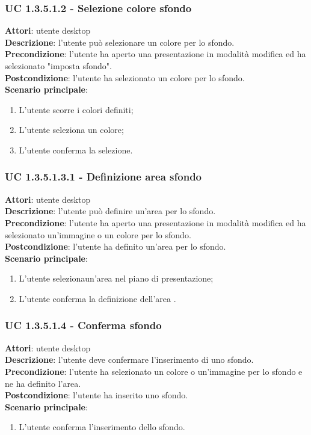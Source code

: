\subsubsection{UC 1.3.5.1.2 - Selezione colore sfondo}{
	\label{uc1.3.5.1.2}
	\textbf{Attori}: utente desktop \\
	\textbf{Descrizione}: l'utente può selezionare un colore per lo sfondo. \\
	\textbf{Precondizione}: l'utente ha aperto una presentazione in modalità modifica ed ha selezionato "imposta sfondo".	\\
	\textbf{Postcondizione}: l'utente ha selezionato un colore per lo sfondo.	\\
	\textbf{Scenario principale}:
	\begin{enumerate}
		\item L'utente scorre i colori definiti;
		\item L'utente seleziona un colore;
		\item L'utente conferma la selezione.
	\end{enumerate}
}
\subsubsection{UC 1.3.5.1.3.1 - Definizione area sfondo}{
	\label{uc1.3.5.1.3.1}
	\textbf{Attori}: utente desktop \\
	\textbf{Descrizione}: l'utente può definire un'area per lo sfondo. \\
	\textbf{Precondizione}: l'utente ha aperto una presentazione in modalità modifica ed ha selezionato un'immagine o un colore per lo sfondo.	\\
	\textbf{Postcondizione}: l'utente ha definito un'area per lo sfondo.	\\
	\textbf{Scenario principale}:
	\begin{enumerate}
		\item L'utente selezionaun'area nel piano di presentazione;
		\item L'utente conferma la definizione dell'area .
	\end{enumerate}
}

\subsubsection{UC 1.3.5.1.4 - Conferma sfondo}{
	\label{uc1.3.5.1.4}
	\textbf{Attori}: utente desktop \\
	\textbf{Descrizione}: l'utente deve confermare l'inserimento di uno sfondo. \\
	\textbf{Precondizione}: l'utente ha selezionato un colore o un'immagine per lo sfondo e ne ha definito l'area.	\\
	\textbf{Postcondizione}: l'utente ha inserito uno sfondo.	\\
	\textbf{Scenario principale}:
	\begin{enumerate}
		\item L'utente conferma l'inserimento dello sfondo.
	\end{enumerate}
}
